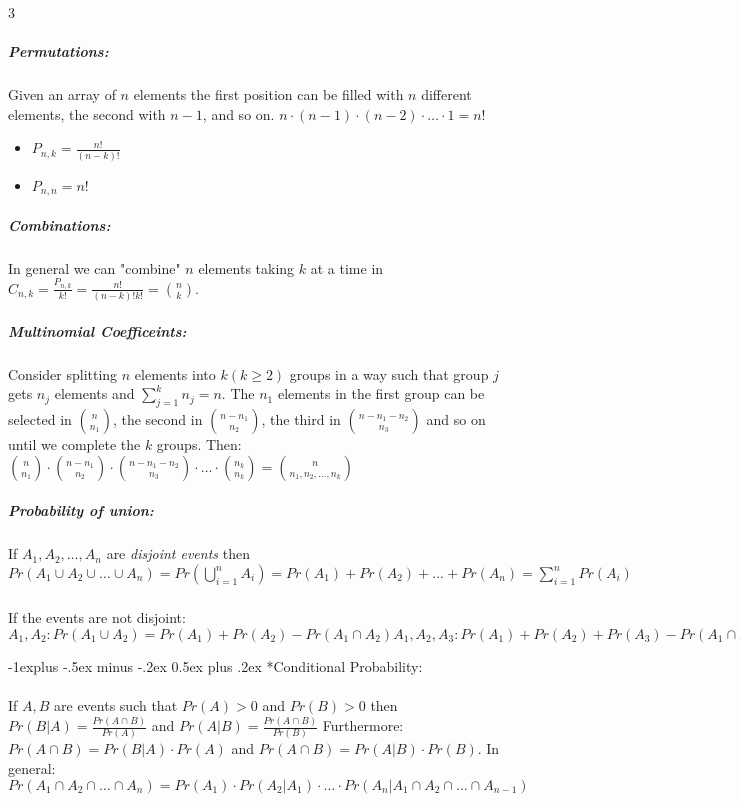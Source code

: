 \documentclass[landscape,10pt]{article}
\makeatletter
\renewcommand{\subsection}{\@startsection{subsection}{2}{0mm}%
                                {-1explus -.5ex minus -.2ex}%
                                {0.5ex plus .2ex}%
                                {\normalfont\normalsize\bfseries}}
\makeatother
\begin{document}
\begin{multicols}{3}
        \subparagraph*{Permutations: } 
            Given an array of $n$ elements the first position can be filled with $n$ different elements, the second with $n-1$, and so on. $n \cdot (n-1) \cdot (n-2) \cdot \ldots \cdot 1 = n!$

            \begin{itemize}
                \item[] \(P_{n,k} = \frac{n!}{(n-k)!}\)
                \item[] \(P_{n,n} = n!\)
            \end{itemize}

        \subparagraph*{Combinations: }
            In general we can "combine" $n$ elements taking $k$ at a time in \(C_{n,k} = \frac{P_{n,k}}{k!} = \frac{n!}{(n-k)!k!} = {n \choose k} \). 

        \subparagraph*{Multinomial Coefficeints: } 
            Consider splitting $n$ elements into $k (k \geq 2)$ groups in a way such that group $j$ gets $n_j$ elements and $\sum\limits_{j = 1}^{k}n_j = n$. The $n_1$ elements in the first group can be selected in ${n \choose n_1}$, the second in ${n-n_1 \choose n_2}$, the third in ${n-n_1-n_2 \choose n_3}$ and so on until we complete the $k$ groups. Then: ${n \choose n_1}\cdot{n-n_1 \choose n_2}\cdot{n-n_1-n_2 \choose n_3}\cdot \ldots \cdot{n_k \choose n_k} = {n \choose n_1, n_2, \ldots, n_k}$
        \subparagraph*{Probability of union:}
            If $A_1, A_2, \ldots, A_n$ are \textit{disjoint events} then 
            \(Pr(A_1 \cup A_2 \cup \ldots \cup A_n) 
            = Pr(\bigcup\limits_{i=1}^{n}A_i) 
            = Pr(A_1) + Pr(A_2) + \ldots + Pr(A_n) 
            = \sum\limits_{i=1}^{n}Pr(A_i) \)
        \subparagraph*{} 
            If the events are not disjoint: 
            \( A_1, A_2: Pr(A_1 \cup A_2) = Pr(A_1) + Pr(A_2) - Pr(A_1 \cap A_2) 
            A_1, A_2, A_3: Pr(A_1) + Pr(A_2) + Pr(A_3) - Pr(A_1 \cap A_2) - Pr(A_1 \cap A_3) - Pr(A_2 \cap A_3) + Pr(A_1 \cap A_2 \cap A_3)\)     
        
    \subsection*{Conditional Probability: }
        \paragraph*{}
            If $A, B$ are events such that $Pr(A) > 0$ and $Pr(B) > 0$ then $Pr(B|A) = \frac{Pr(A\cap B)}{Pr(A)}$ and 
            $Pr(A|B) = \frac{Pr(A \cap B)}{Pr(B)}$ 
            Furthermore: $Pr(A \cap B) = Pr(B|A) \cdot Pr(A)$ and $Pr(A \cap B) = Pr(A|B) \cdot Pr(B)$. In general: $Pr(A_1 \cap A_2 \cap \ldots \cap A_n) = Pr(A_1) \cdot Pr(A_2 | A_1) \cdot \ldots \cdot Pr(A_n | A_1 \cap A_2 \cap \ldots \cap A_{n-1})$

\end{multicols}
\end{document}
